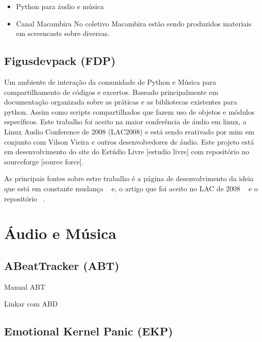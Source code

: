 \begin{itemize}
    \item Python para áudio e música


    \item Canal Macambira
No coletivo Macambira estão sendo produzidos materiais em screencasts sobre
diversas.
\end{itemize}



\subsection{Figusdevpack (FDP)}

Um ambiente de interação da comunidade de Python e Música 
para compartilhamento de códigos e excertos. Baseado principalmente
em documentação organizada sobre as práticas e as bibliotecas
existentes para python. Assim como scripts compartilhados que
fazem uso de objetos e módulos específicos. Este trabalho foi aceito na
maior conferência de áudio em linux, a Linux Audio Conference de 2008
(LAC2008) e está sendo reativado por mim em conjunto com Vilson Vieira
e outros desenvolvedores de áudio. Este projeto está em desenvolvimento
do site do Estúdio Livre [estudio livre] com repositório no sourceforge [source force].

As principais fontes sobre estre trabalho é a página de desenvolvimento da ideia
que está em constante mudança ~\cite{http://estudiolivre.org/tiki-index.php?page=fdp&highlight=fdp fdpel}
e, o artigo que foi aceito no LAC de 2008 ~\cite{http://www.estudiolivre.org/el-gallery_view.php?arquivoId=8221 fdplac2008}
e o repositório ~\cite{http://sourceforge.net/projects/fdpack/develop fdpsf}.

\section{Áudio e Música}

\subsection{ABeatTracker (ABT)}

Manual ABT

Linkar com ABD

\subsection{Emotional Kernel Panic (EKP)}

